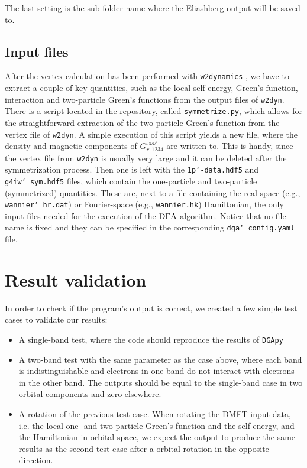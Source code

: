 \documentclass[\main/main.tex]{subfiles}
\begin{document}
The last setting is the sub-folder name where the Eliashberg output will be saved to.
 
\subsection{Input files}

After the vertex calculation has been performed with \texttt{w2dynamics} \cite{Wallerberger2019}, we have to extract a couple of key quantities, such as the local self-energy, Green's function, interaction and two-particle Green's functions from the output files of \texttt{w2dyn}. There is a script located in the repository, called \texttt{symmetrize.py}, which allows for the straightforward extraction of the two-particle Green's function from the vertex file of \texttt{w2dyn}. A simple execution of this script yields a new file, where the density and magnetic components of $G^{\omega\nu\nu'}_{r;\mathfrak{1234}}$ are written to. This is handy, since the vertex file from \texttt{w2dyn} is usually very large and it can be deleted after the symmetrization process. Then one is left with the \texttt{1p\char`-data.hdf5} and \texttt{g4iw\char`_sym.hdf5} files, which contain the one-particle and two-particle (symmetrized) quantities. These are, next to a file containing the real-space (e.g., \texttt{wannier\char`_hr.dat}) or Fourier-space (e.g., \texttt{wannier.hk}) Hamiltonian, the only input files needed for the execution of the $\text{D}\Gamma\text{A}$ algorithm. Notice that no file name is fixed and they can be specified in the corresponding \texttt{dga\char`_config.yaml} file.

\section{Result validation}

In order to check if the program's output is correct, we created a few simple test cases to validate our results:
\begin{itemize}
\item A single-band test, where the code should reproduce the results of \texttt{DGApy}
\item A two-band test with the same parameter as the case above, where each band is indistinguishable and electrons in one band do not interact with electrons in the other band. The outputs should be equal to the single-band case in two orbital components and zero elsewhere.
\item A rotation of the previous test-case. When rotating the DMFT input data, i.e. the local one- and two-particle Green's function and the self-energy, and the Hamiltonian in orbital space, we expect the output to produce the same results as the second test case after a orbital rotation in the opposite direction.
\end{itemize}
\end{document}
